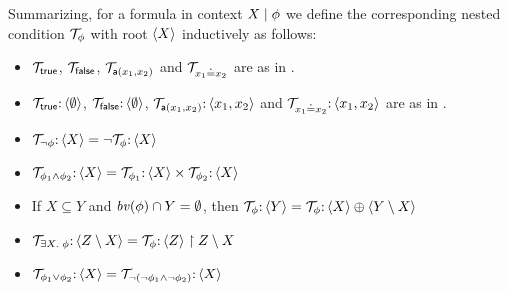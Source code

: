 Summarizing, for a formula in context ${X} \mid {\phi}$ we define the corresponding nested condition ${\mathcal{T}}_\phi$ with root $\langle X\rangle$  inductively as follows:

\begin{itemize}
	\item ${\mathcal{T}}_{\mathsf{true}}$, ${\mathcal{T}}_{\mathsf{false}}$, ${\mathcal{T}}_{\mathsf{a}(x_1,x_2)}$ and ${\mathcal{T}}_{x_1\mathbin{\doteq} x_2}$ are as in . 
	\item ${\mathcal{T}}_{\mathsf{true}} {:}\, \langle \emptyset\rangle$, ${\mathcal{T}}_{\mathsf{false}}{:}\, \langle \emptyset\rangle$, ${\mathcal{T}}_{\mathsf{a}(x_1,x_2)}{:}\, \langle x_1,x_2\rangle$ and ${\mathcal{T}}_{x_1\mathbin{\doteq} x_2}{:}\, \langle x_1,x_2\rangle$ are as in .
	\item  ${\mathcal{T}}_{\neg \phi} {:}\,\langle X\rangle = \neg {\mathcal{T}}_{\phi} {:}\, \langle X\rangle$
	\item  ${\mathcal{T}}_{\phi_1 \wedge \phi_2}{:}\,\langle X\rangle = {\mathcal{T}}_{\phi_1}{:}\,\langle X\rangle \times {\mathcal{T}}_{\phi_2} {:}\,\langle X\rangle$
	\item If $X \subseteq Y$ and $\mathit{bv}(\phi)\cap Y = \emptyset$, then ${\mathcal{T}}_\phi {:}\, \langle Y\rangle =  {\mathcal{T}}_\phi {:}\, \langle X\rangle \oplus \langle Y\setminus X\rangle$
	\item ${\mathcal{T}}_{\exists X.\; \phi}{:}\,\langle Z \setminus X\rangle = {\mathcal{T}}_{\phi}{:}\,\langle Z\rangle \restriction Z\setminus X$
	\item ${\mathcal{T}}_{\phi_1 \vee \phi_2}{:}\,\langle X\rangle = {\mathcal{T}}_{\neg( \neg \phi_1 \wedge \neg \phi_2)}{:}\,\langle X\rangle$
\end{itemize}

